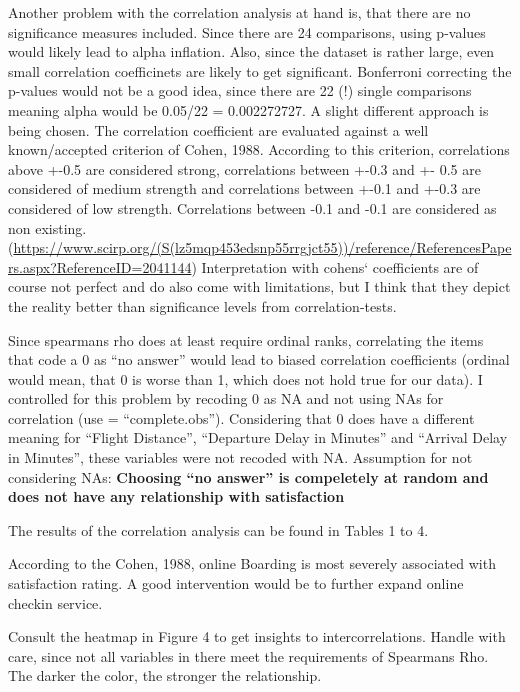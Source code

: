 \documentclass[
]{article}
\begin{document}
Another problem with the correlation analysis at hand is, that there are
no significance measures included. Since there are 24 comparisons, using
p-values would likely lead to alpha inflation. Also, since the dataset
is rather large, even small correlation coefficinets are likely to get
significant. Bonferroni correcting the p-values would not be a good
idea, since there are 22 (!) single comparisons meaning alpha would be
0.05/22 = 0.002272727. A slight different approach is being chosen. The
correlation coefficient are evaluated against a well known/accepted
criterion of Cohen, 1988. According to this criterion, correlations
above +-0.5 are considered strong, correlations between +-0.3 and +- 0.5
are considered of medium strength and correlations between +-0.1 and
+-0.3 are considered of low strength. Correlations between -0.1 and -0.1
are considered as non existing.
(\url{https://www.scirp.org/(S(lz5mqp453edsnp55rrgjct55))/reference/ReferencesPapers.aspx?ReferenceID=2041144})
Interpretation with cohens` coefficients are of course not perfect and
do also come with limitations, but I think that they depict the reality
better than significance levels from correlation-tests.

Since spearmans rho does at least require ordinal ranks, correlating the
items that code a 0 as ``no answer'' would lead to biased correlation
coefficients (ordinal would mean, that 0 is worse than 1, which does not
hold true for our data). I controlled for this problem by recoding 0 as
NA and not using NAs for correlation (use = ``complete.obs'').
Considering that 0 does have a different meaning for ``Flight
Distance'', ``Departure Delay in Minutes'' and ``Arrival Delay in
Minutes'', these variables were not recoded with NA. Assumption for not
considering NAs: \textbf{Choosing ``no answer'' is compeletely at random
and does not have any relationship with satisfaction}

The results of the correlation analysis can be found in Tables 1 to 4.

According to the Cohen, 1988, online Boarding is most severely
associated with satisfaction rating. A good intervention would be to
further expand online checkin service.

Consult the heatmap in Figure 4 to get insights to intercorrelations.
Handle with care, since not all variables in there meet the requirements
of Spearmans Rho. The darker the color, the stronger the relationship.
\end{document}
